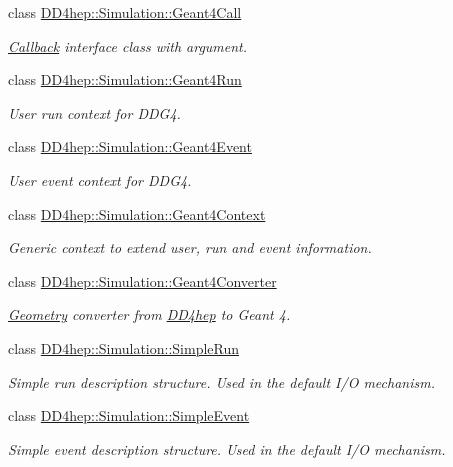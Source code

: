 \begin{DoxyCompactItemize}
class \hyperlink{class_d_d4hep_1_1_simulation_1_1_geant4_call}{D\+D4hep\+::\+Simulation\+::\+Geant4\+Call}
\begin{DoxyCompactList}\small\item\em \hyperlink{class_d_d4hep_1_1_callback}{Callback} interface class with argument. \end{DoxyCompactList}\item 
class \hyperlink{class_d_d4hep_1_1_simulation_1_1_geant4_run}{D\+D4hep\+::\+Simulation\+::\+Geant4\+Run}
\begin{DoxyCompactList}\small\item\em User run context for D\+D\+G4. \end{DoxyCompactList}\item 
class \hyperlink{class_d_d4hep_1_1_simulation_1_1_geant4_event}{D\+D4hep\+::\+Simulation\+::\+Geant4\+Event}
\begin{DoxyCompactList}\small\item\em User event context for D\+D\+G4. \end{DoxyCompactList}\item 
class \hyperlink{class_d_d4hep_1_1_simulation_1_1_geant4_context}{D\+D4hep\+::\+Simulation\+::\+Geant4\+Context}
\begin{DoxyCompactList}\small\item\em Generic context to extend user, run and event information. \end{DoxyCompactList}\item 
class \hyperlink{class_d_d4hep_1_1_simulation_1_1_geant4_converter}{D\+D4hep\+::\+Simulation\+::\+Geant4\+Converter}
\begin{DoxyCompactList}\small\item\em \hyperlink{namespace_d_d4hep_1_1_geometry}{Geometry} converter from \hyperlink{namespace_d_d4hep}{D\+D4hep} to Geant 4. \end{DoxyCompactList}\item 
class \hyperlink{class_d_d4hep_1_1_simulation_1_1_simple_run}{D\+D4hep\+::\+Simulation\+::\+Simple\+Run}
\begin{DoxyCompactList}\small\item\em Simple run description structure. Used in the default I/O mechanism. \end{DoxyCompactList}\item 
class \hyperlink{class_d_d4hep_1_1_simulation_1_1_simple_event}{D\+D4hep\+::\+Simulation\+::\+Simple\+Event}
\begin{DoxyCompactList}\small\item\em Simple event description structure. Used in the default I/O mechanism. \end{DoxyCompactList}\item 

\end{DoxyCompactItemize}
